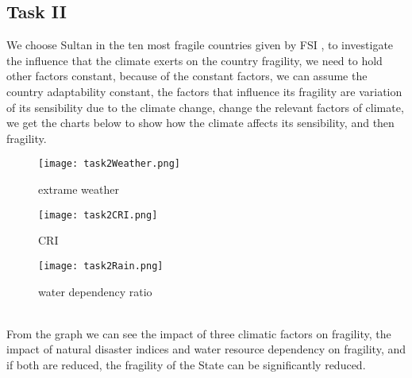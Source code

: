 \documentclass{mcmthesis}
\begin{document}
\subsection{Task II}
We choose Sultan in the ten most fragile countries given by FSI , 
to investigate the influence that the climate exerts on the country fragility, 
we need to hold other factors constant, because of the constant factors, 
we can assume the country adaptability constant, the factors that influence 
its fragility are variation of its sensibility due to the climate change, 
change the relevant factors of climate, we get the charts below to show 
how the climate affects its sensibility, and then fragility.
\begin{figure}[h]
  \begin{minipage}[h]{0.48\textwidth}
  \flushleft
  \texttt{[image: task2Weather.png]}
  \caption{extrame weather}
  \end{minipage}
  \begin{minipage}[h]{0.48\textwidth}
  \flushright
  \texttt{[image: task2CRI.png]}
  \caption{CRI}
  \end{minipage} 
\end{figure}
\begin{figure}[h]
  \begin{minipage}[h]{0.50\textwidth}
  \flushleft
  \texttt{[image: task2Rain.png]}
  \caption{water dependency ratio}
  \end{minipage}
\end{figure} \\
From the graph we can see the impact of three climatic factors on fragility, 
the impact of natural disaster indices and water resource dependency on fragility, 
and if both are reduced, the fragility of the State can be significantly reduced.
\newpage
\end{document}
